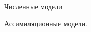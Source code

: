 \begin{chapter}{Численные модели}
\begin{section}{Ассимиляционные модели.}


\end{section}
\end{chapter}
